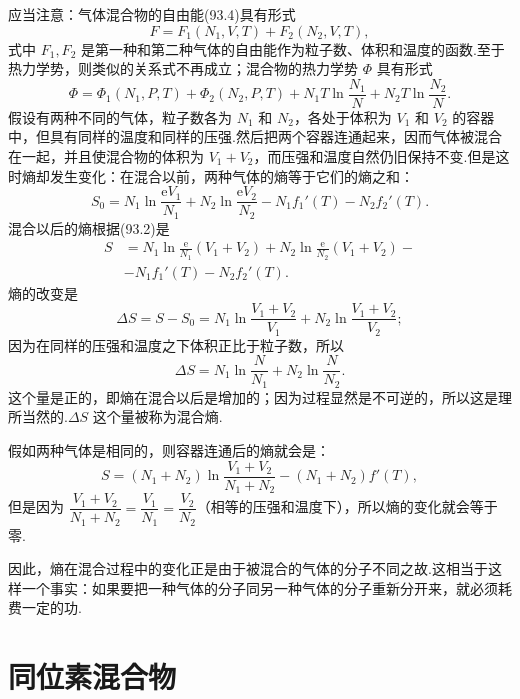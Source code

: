 应当注意：气体混合物的自由能(93.4)具有形式
\begin{equation*}
  F=F_1(N_1,V,T)+F_2(N_2,V,T),
\end{equation*}
式中 $F_1,F_2$ 是第一种和第二种气体的自由能作为粒子数、体积和温度的函数.至于热力学势，则类似的关系式不再成立；混合物的热力学势 $\varPhi$ 具有形式
\begin{equation*}
  \varPhi=\varPhi_1(N_1,P,T)+\varPhi_2(N_2,P,T)
  +N_1T\ln\frac{N_1}{N}+N_2T\ln\frac{N_2}{N}.
\end{equation*}
假设有两种不同的气体，粒子数各为 $N_1$ 和 $N_2$，各处于体积为 $V_1$ 和 $V_2$ 的容器中，但具有同样的温度和同样的压强.然后把两个容器连通起来，因而气体被混合在一起，并且使混合物的体积为 $V_1+V_2$，而压强和温度自然仍旧保持不变.但是这时熵却发生变化：在混合以前，两种气体的熵等于它们的熵之和：
\begin{equation*}
  S_0=N_1\ln\frac{\mathrm{e}V_1}{N_1}+N_2\ln\frac{\mathrm{e}V_2}{N_2}
  -N_1f_1'(T)-N_2f_2'(T).
\end{equation*}
混合以后的熵根据(93.2)是
\begin{equation*}
\begin{aligned}
  S&=N_1\ln\frac{\mathrm{e}}{N_1}(V_1+V_2)
  +N_2\ln\frac{\mathrm{e}}{N_2}(V_1+V_2)-\\
  &-N_1f_1'(T)-N_2f_2'(T).
\end{aligned}
\end{equation*}
熵的改变是
\begin{equation*}
  \Delta S=S-S_0
  =N_1\ln\frac{V_1+V_2}{V_1}+N_2\ln\frac{V_1+V_2}{V_2};
\end{equation*}
因为在同样的压强和温度之下体积正比于粒子数，所以
\begin{equation}
  \Delta S=N_1\ln\frac{N}{N_1}+N_2\ln\frac{N}{N_2}.
\end{equation}
这个量是正的，即熵在混合以后是增加的；因为过程显然是不可逆的，所以这是理所当然的.$\Delta S$ 这个量被称为混合熵.

假如两种气体是相同的，则容器连通后的熵就会是：
\begin{equation*}
  S=(N_1+N_2)\ln\frac{V_1+V_2}{N_1+N_2}-(N_1+N_2)f'(T),
\end{equation*}
但是因为 $\dfrac{V_1+V_2}{N_1+N_2}=\dfrac{V_1}{N_1}=\dfrac{V_2}{N_2}$（相等的压强和温度下），所以熵的变化就会等于零.

因此，熵在混合过程中的变化正是由于被混合的气体的分子不同之故.这相当于这样一个事实：如果要把一种气体的分子同另一种气体的分子重新分开来，就必须耗费一定的功.

\section{同位素混合物}

